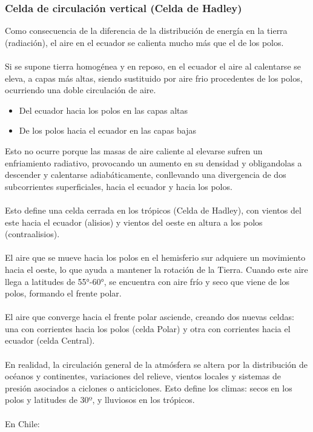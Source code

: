 \subsubsection{Celda de circulación vertical (Celda de Hadley)}

Como consecuencia de la diferencia de la distribución de energía en la tierra (radiación), el aire en el ecuador se calienta mucho más que el de los polos. 
\\\\
Si se supone tierra homogénea y en reposo, en el ecuador el aire al calentarse se eleva, a capas más altas, siendo sustituido por aire frio procedentes de los polos, ocurriendo una doble circulación de aire.

\begin{itemize}
    \item Del ecuador hacia los polos en las capas altas
    \item De los polos hacia el ecuador en las capas bajas
\end{itemize}

Esto no ocurre porque las masas de aire caliente al elevarse sufren un enfriamiento radiativo, provocando un aumento en su densidad y obligandolas a descender y calentarse adiabáticamente, conllevando una divergencia de dos subcorrientes superficiales, hacia el ecuador y hacia los polos.
\\\\
Esto define una celda cerrada en los trópicos (Celda de Hadley), con vientos del este hacia el ecuador (alisios) y vientos del oeste en altura a los polos (contraalisios).
\\\\
El aire que se mueve hacia los polos en el hemisferio sur adquiere un movimiento hacia el oeste, lo que ayuda a mantener la rotación de la Tierra. Cuando este aire llega a latitudes de 55°-60°, se encuentra con aire frío y seco que viene de los polos, formando el frente polar.
\\\\
El aire que converge hacia el frente polar asciende, creando dos nuevas celdas: una con corrientes hacia los polos (celda Polar) y otra con corrientes hacia el ecuador (celda Central).
\\\\
En realidad, la circulación general de la atmósfera se altera por la distribución de océanos y continentes, variaciones del relieve, vientos locales y sistemas de presión asociados a ciclones o anticiclones. Esto define los climas: secos en los polos y latitudes de 30º, y lluviosos en los trópicos.
\\\\
En Chile:


